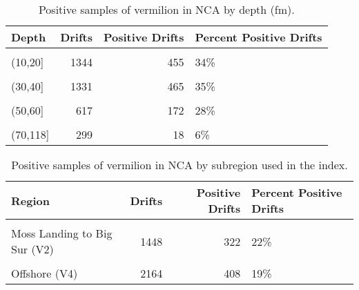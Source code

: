 \documentclass[11pt,
  english,
  a4paper,
]{article}
\begin{document}
\begin{table}

\caption{\label{tab:tab-depth-debwv}Positive samples of vermilion in NCA by depth (fm).}
\centering
\begin{tabular}[t]{lrrl}
\toprule
Depth & Drifts & Positive Drifts &  Percent Positive Drifts\\
\midrule
\cellcolor{gray!6}{(0,10]} & \cellcolor{gray!6}{478} & \cellcolor{gray!6}{113} & \cellcolor{gray!6}{24\%}\\
(10,20] & 1344 & 455 & 34\%\\
\cellcolor{gray!6}{(20,30]} & \cellcolor{gray!6}{1198} & \cellcolor{gray!6}{410} & \cellcolor{gray!6}{34\%}\\
(30,40] & 1331 & 465 & 35\%\\
\cellcolor{gray!6}{(40,50]} & \cellcolor{gray!6}{1067} & \cellcolor{gray!6}{347} & \cellcolor{gray!6}{33\%}\\
\addlinespace
(50,60] & 617 & 172 & 28\%\\
\cellcolor{gray!6}{(60,70]} & \cellcolor{gray!6}{263} & \cellcolor{gray!6}{36} & \cellcolor{gray!6}{14\%}\\
(70,118] & 299 & 18 & 6\%\\
\bottomrule
\end{tabular}
\end{table}

\begin{table}

\caption{\label{tab:tab-region-debwv}Positive samples of vermilion in NCA by subregion used in the index.}
\centering
\begin{tabular}[t]{lrrl}
\toprule
Region & Drifts & Positive Drifts & Percent Positive Drifts\\
\midrule
\cellcolor{gray!6}{Ft. Bragg to Santa Cruz (V1)} & \cellcolor{gray!6}{1317} & \cellcolor{gray!6}{362} & \cellcolor{gray!6}{27\%}\\
Moss Landing to Big Sur (V2) & 1448 & 322 & 22\%\\
\cellcolor{gray!6}{San Luis Obispo to Pt. Conception (V3)} & \cellcolor{gray!6}{1668} & \cellcolor{gray!6}{924} & \cellcolor{gray!6}{55\%}\\
Offshore (V4) & 2164 & 408 & 19\%\\
\bottomrule
\end{tabular}
\end{table}
\end{document}
